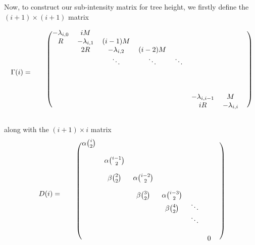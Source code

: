 \documentclass[12pt,a4paper]{article}
\begin{document}
Now, to construct our sub-intensity matrix for tree height, we firstly define the $(i+1) \times (i+1)$ matrix
\begin{center}
\begin{align}
    \Gamma(i) = \quad \begin{blockarray}{cccccccccc}
    \begin{block}{c(ccccccccc)}
     & -\lambda_{i,0} & iM &  & & & & \\ 
     & R & -\lambda_{i,1} & (i-1)M &  & & & \\
     & & 2R & -\lambda_{i,2} & (i-2)M & & &\\
                   & & &\ddots & \ddots& \ddots & & & \\
                    & & & & & & & \\
                      & & & &  & & & \\
                       & & & &  & & & \\
                    & & & & & &-\lambda_{i,i-1} & M\\
                    & & & & &  & iR & -\lambda_{i,i} \\ 
           \end{block}
\end{blockarray} 
\end{align}
\end{center}
along with the $(i+1) \times i$ matrix
\begin{align}
    D(i) = \quad \begin{blockarray}{cccccccc}
    \begin{block}{c(ccccccc)}
      & \alpha\binom{i}{2} & & & & \\
     \\
     & & \alpha\binom{i-1}{2} & & & \\
    \\
     & &\beta\binom{2}{2} & \alpha\binom{i-2}{2} & & & \\
    \\
     & & & \beta\binom{3}{2} & \alpha\binom{i-3}{2} & \\
    & & & &\beta\binom{4}{2} &\ddots & & \\
    & & & & &\ddots & \\
    \\
   & & & & & & 0 \\ 
    \end{block}
    \end{blockarray}
\end{align}
\end{document}
